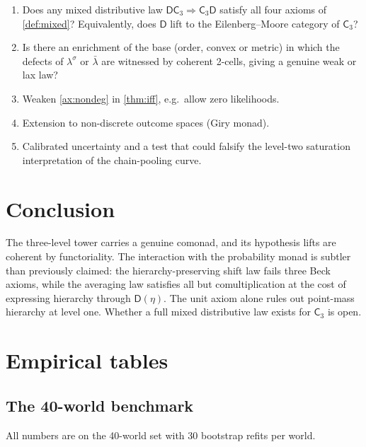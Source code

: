 \documentclass[11pt]{article}
\theoremstyle{definition}
\theoremstyle{remark}
\newcommand{\D}{\mathsf{D}}
\newcommand{\C}{\mathsf{C}}
\newcommand{\lb}{\bar\lambda}
\newcommand{\ls}{\lambda^{\sigma}}
\begin{document}
\begin{enumerate}[leftmargin=*]
\item Does any mixed distributive law $\D\C_3\Rightarrow\C_3\D$ satisfy all four axioms of
  \cref{def:mixed}? Equivalently, does $\D$ lift to the Eilenberg--Moore category of $\C_3$?
\item Is there an enrichment of the base (order, convex or metric) in which the defects of $\ls$ or
  $\lb$ are witnessed by coherent 2-cells, giving a genuine weak or lax law?
\item Weaken \cref{ax:nondeg} in \cref{thm:iff}, e.g.\ allow zero likelihoods.
\item Extension to non-discrete outcome spaces (Giry monad).
\item Calibrated uncertainty and a test that could falsify the level-two saturation interpretation of
  the chain-pooling curve.
\end{enumerate}

\section{Conclusion}

The three-level tower carries a genuine comonad, and its hypothesis lifts are coherent by
functoriality. The interaction with the probability monad is subtler than previously claimed: the
hierarchy-preserving shift law fails three Beck axioms, while the averaging law satisfies all but
comultiplication at the cost of expressing hierarchy through $\D(\eta)$. The unit axiom alone rules out
point-mass hierarchy at level one. Whether a full mixed distributive law exists for $\C_3$ is open.

\appendix

\section{Empirical tables}\label{app:empirical}

\subsection{The 40-world benchmark}
All numbers are on the 40-world set with 30 bootstrap refits per world.
\end{document}
